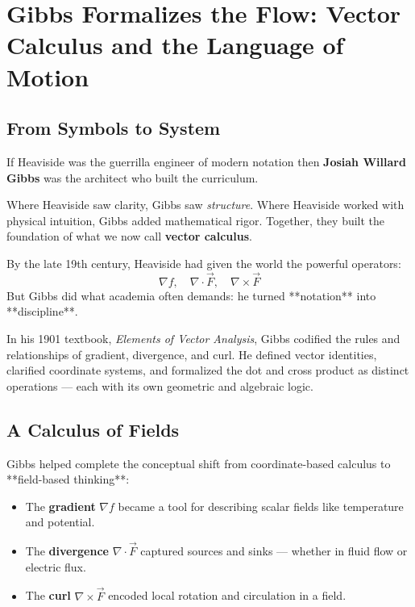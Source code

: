 \section{Gibbs Formalizes the Flow: Vector Calculus and the Language of Motion}

\subsection{From Symbols to System}

If Heaviside was the guerrilla engineer of modern notation then \textbf{Josiah Willard Gibbs} was the architect who built the curriculum.

Where Heaviside saw clarity, Gibbs saw \emph{structure}.  
Where Heaviside worked with physical intuition, Gibbs added mathematical rigor.  
Together, they built the foundation of what we now call \textbf{vector calculus}.

By the late 19th century, Heaviside had given the world the powerful operators:
\[
\nabla f, \quad \nabla \cdot \vec{F}, \quad \nabla \times \vec{F}
\]
But Gibbs did what academia often demands:  
he turned **notation** into **discipline**.

In his 1901 textbook, \emph{Elements of Vector Analysis}, Gibbs codified the rules and relationships of gradient, divergence, and curl. He defined vector identities, clarified coordinate systems, and formalized the dot and cross product as distinct operations — each with its own geometric and algebraic logic.

\subsection{A Calculus of Fields}

Gibbs helped complete the conceptual shift from coordinate-based calculus to **field-based thinking**:

\begin{itemize}
    \item The \textbf{gradient} \( \nabla f \) became a tool for describing scalar fields like temperature and potential.
    \item The \textbf{divergence} \( \nabla \cdot \vec{F} \) captured sources and sinks — whether in fluid flow or electric flux.
    \item The \textbf{curl} \( \nabla \times \vec{F} \) encoded local rotation and circulation in a field.
\end{itemize}

